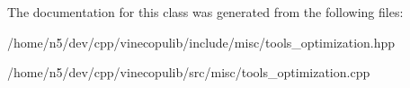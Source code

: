 The documentation for this class was generated from the following files\+:\begin{DoxyCompactItemize}
\item 
/home/n5/dev/cpp/vinecopulib/include/misc/tools\+\_\+optimization.\+hpp\item 
/home/n5/dev/cpp/vinecopulib/src/misc/tools\+\_\+optimization.\+cpp\end{DoxyCompactItemize}
